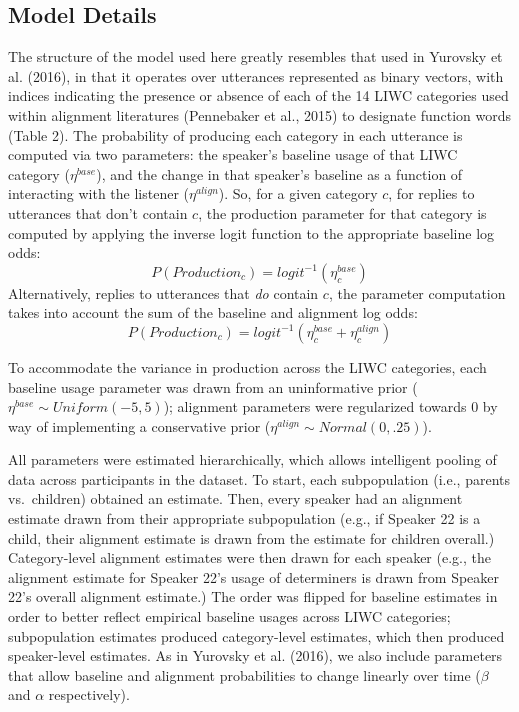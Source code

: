 \documentclass[10pt, letterpaper]{article}
\begin{document}
\hypertarget{model-details}{%
\subsection{Model Details}\label{model-details}}

The structure of the model used here greatly resembles that used in
Yurovsky et al. (2016), in that it operates over utterances represented
as binary vectors, with indices indicating the presence or absence of
each of the 14 LIWC categories used within alignment literatures
(Pennebaker et al., 2015) to designate function words (Table 2). The
probability of producing each category in each utterance is computed via
two parameters: the speaker's baseline usage of that LIWC category
(\(\eta^{base}\)), and the change in that speaker's baseline as a
function of interacting with the listener (\(\eta^{align}\)). So, for a
given category \(c\), for replies to utterances that don't contain
\(c\), the production parameter for that category is computed by
applying the inverse logit function to the appropriate baseline log
odds: \[
P(Production_c) = logit^{-1}(\eta^{base}_c)
\] Alternatively, replies to utterances that \emph{do} contain \(c\),
the parameter computation takes into account the sum of the baseline and
alignment log odds: \[
P(Production_c) = logit^{-1}(\eta^{base}_c+\eta^{align}_c)
\]

To accommodate the variance in production across the LIWC categories,
each baseline usage parameter was drawn from an uninformative prior
(\(\eta^{base} \sim Uniform(-5,5)\)); alignment parameters were
regularized towards 0 by way of implementing a conservative prior
(\(\eta^{align} \sim Normal(0,.25)\)).

All parameters were estimated hierarchically, which allows intelligent
pooling of data across participants in the dataset. To start, each
subpopulation (i.e., parents vs.~children) obtained an estimate. Then,
every speaker had an alignment estimate drawn from their appropriate
subpopulation (e.g., if Speaker 22 is a child, their alignment estimate
is drawn from the estimate for children overall.) Category-level
alignment estimates were then drawn for each speaker (e.g., the
alignment estimate for Speaker 22's usage of determiners is drawn from
Speaker 22's overall alignment estimate.) The order was flipped for
baseline estimates in order to better reflect empirical baseline usages
across LIWC categories; subpopulation estimates produced category-level
estimates, which then produced speaker-level estimates. As in Yurovsky
et al. (2016), we also include parameters that allow baseline and
alignment probabilities to change linearly over time (\(\beta\) and
\(\alpha\) respectively).
\end{document}
